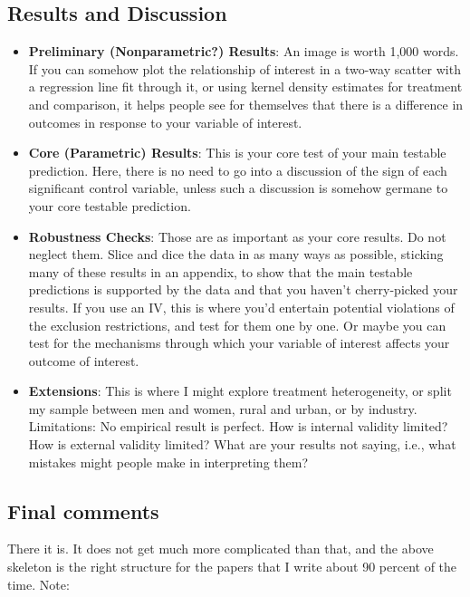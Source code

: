 \subsection{Results and Discussion}
\begin{itemize}
\item \textbf{Preliminary (Nonparametric?) Results}: An image is worth 1,000 words. If you can somehow plot the relationship of interest in a two-way scatter with a regression line fit through it, or using kernel density estimates for treatment and comparison, it helps people see for themselves that there is a difference in outcomes in response to your variable of interest.

\item \textbf{Core (Parametric) Results}: This is your core test of your main testable prediction. Here, there is no need to go into a discussion of the sign of each significant control variable, unless such a discussion is somehow germane to your core testable prediction.

\item \textbf{Robustness Checks}: Those are as important as your core results. Do not neglect them. Slice and dice the data in as many ways as possible, sticking many of these results in an appendix, to show that the main testable predictions is supported by the data and that you haven’t cherry-picked your results. If you use an IV, this is where you’d entertain potential violations of the exclusion restrictions, and test for them one by one. Or maybe you can test for the mechanisms through which your variable of interest affects your outcome of interest.

\item \textbf{Extensions}: This is where I might explore treatment heterogeneity, or split my sample between men and women, rural and urban, or by industry.
Limitations: No empirical result is perfect. How is internal validity limited? How is external validity limited? What are your results not saying, i.e., what mistakes might people make in interpreting them?
\end{itemize}

\subsection{Final comments}
There it is. It does not get much more complicated than that, and the above skeleton is the right structure for the papers that I write about 90 percent of the time. Note:

